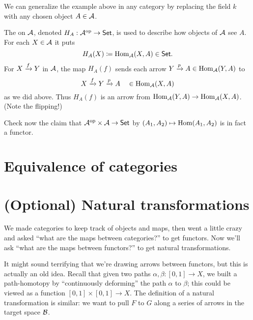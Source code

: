 
We can generalize the example above in any category by
replacing the field $k$ with any chosen object $A \in \AA$.

\begin{example}
	The  on $\AA$,
	denoted $H_A : \AA\op \to \catname{Set}$,
	is used to describe how objects of $\AA$ see $A$.
	For each $X \in \AA$ it puts \[ H_A(X) \defeq \Hom_{\AA}(X, A) \in \catname{Set}. \]
	For $X \taking{f} Y$ in $\AA$,
	the map $H_A(f)$ sends each arrow $Y \taking{p} A \in \Hom_\AA(Y,A)$ to 
	\[ X \taking{f} Y \taking{p} A \quad \in \Hom_\AA(X,A) \]
	as we did above.
	Thus $H_A(f)$ is an arrow from $\Hom_\AA(Y,A) \to \Hom_\AA(X,A)$.
	(Note the flipping!)
\end{example}

\begin{exercise}
	Check now the claim that $\AA\op \times \AA \to \catname{Set}$
	by $(A_1, A_2) \mapsto \Hom(A_1, A_2)$ is in fact a functor.
\end{exercise}

\section{Equivalence of categories}

\section{(Optional) Natural transformations}
We made categories to keep track of objects and maps, then went a little crazy and asked
``what are the maps between categories?'' to get functors.
Now we'll ask ``what are the maps between functors?'' to get natural transformations.

It might sound terrifying that we're drawing arrows between functors, but this is actually an old idea.
Recall that given two paths $\alpha, \beta : [0,1] \to X$,
we built a path-homotopy by ``continuously deforming'' the path $\alpha$ to $\beta$;
this could be viewed as a function $[0,1] \times [0,1] \to X$.
The definition of a natural transformation is similar: we want to pull $F$ to $G$
along a series of arrows in the target space $\BB$.

